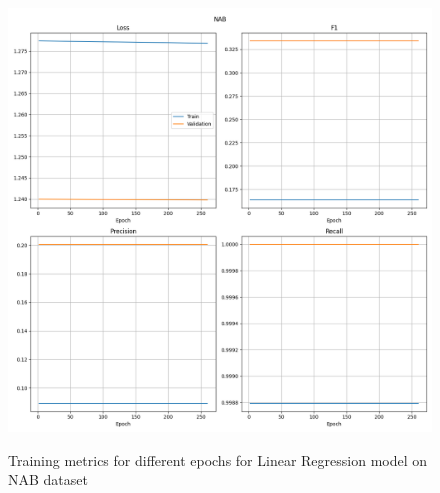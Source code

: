 \documentclass[a4paper, twoside]{report}
\theoremstyle{definition}
\numberwithin{equation}{section}
\begin{document}
\begin{figure}[h!]
    \centering
    \caption{Training metrics for different epochs for Linear Regression model on NAB dataset}
    \includegraphics[width=\textwidth]{plots/LinearRegression_NAB.png}
    \label{fig:LinearRegression_NAB_training}
\end{figure}





\end{document}
